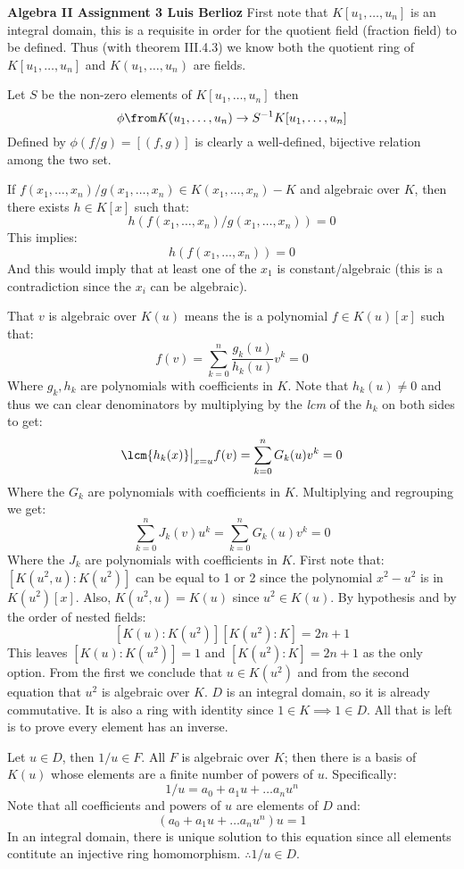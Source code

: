 \noindent\textbf{Algebra II Assignment 3 \hspace{\fill} Luis Berlioz}
First note that $K[u_1,\ldots ,u_n]$ is an integral domain, this is a requisite in order for the quotient field (fraction field) to be defined. Thus (with theorem III.4.3) we know both the quotient ring of $K[u_1,\ldots, u_n]$ and $K(u_1,\ldots, u_n)$ are fields.

Let $S$ be the non-zero elements of $K[u_1,\ldots, u_n]$ then
 $$\phi\from K(u_1,\ldots, u_n) \to S^{-1}K[u_1,\ldots, u_n]$$ 
Defined  by $\phi(f/g)= [(f,g)]$  is clearly a well-defined, bijective relation among the two set.

If $f(x_1,\ldots,x_n)/g(x_1,\ldots,x_n)\in K(x_1,\ldots,x_n)-K$ and algebraic over $K$, then there exists $h\in K[x]$ such that:
$$h\left(f(x_1,\ldots,x_n)/g(x_1,\ldots,x_n)\right) =0$$
This implies:
$$h\left(f(x_1,\ldots,x_n)\right) =0$$
And this would imply that at least one of the $x_1$ is constant/algebraic (this is a contradiction since the $x_i$ can be algebraic).

That $v$ is algebraic over $K(u)$ means the is a polynomial $f\in K(u)[x]$ such that:
$$f(v) = \sum_{k=0}^n \frac{g_k(u)}{h_k(u)} v^k=0$$
Where $g_k,h_k$ are polynomials with coefficients in $K$. 
Note that $h_k(u)\neq 0$ and thus we can clear denominators by multiplying by the \emph{lcm} of the $h_k$ on both sides to get:
$$\lcm\{h_k(x)\}\big|_{x=u}f(v) = \sum_{k=0}^n G_k(u) v^k =0$$
Where the $G_k$ are polynomials with coefficients in $K$. Multiplying and regrouping we get:
$$\sum_{k=0}^n J_k(v) u^k = \sum_{k=0}^n G_k(u) v^k =0$$
Where the $J_k$ are polynomials with coefficients in $K$.
First note that: $[K(u^2,u):K(u^2)]$ can be equal to 1 or 2 since the polynomial $x^2-u^2$ is in $K(u^2)[x]$. Also, $K(u^2,u) =K(u)$ since $u^2 \in K(u)$. By hypothesis and by the order of nested fields:
$$[K(u):K(u^2)][K(u^2):K] = 2n+1$$
This leaves $[K(u):K(u^2)]=1$ and $[K(u^2):K]=2n+1$ as the only option. From the first we conclude that $u\in K(u^2)$ and from the second equation that $u^2$ is algebraic over $K$.
$D$ is an integral domain, so it is already commutative. It is also a ring with identity since $1\in K \implies 1 \in D$. All that is left is to prove every element has an inverse. 

Let $u\in D$, then $1/u \in F$. All $F$ is algebraic over $K$; then there is a basis of $K(u)$ whose elements are a finite number of powers of $u$. Specifically:
$$1/u = a_0 + a_1 u+\ldots a_n u^n$$
Note that all coefficients and powers of $u$ are elements of $D$ and:
$$(a_0 + a_1 u+\ldots a_n u^n)u = 1$$
In an integral domain, there is unique solution to this equation since all elements contitute an injective ring homomorphism. $\therefore 1/u\in D$.

